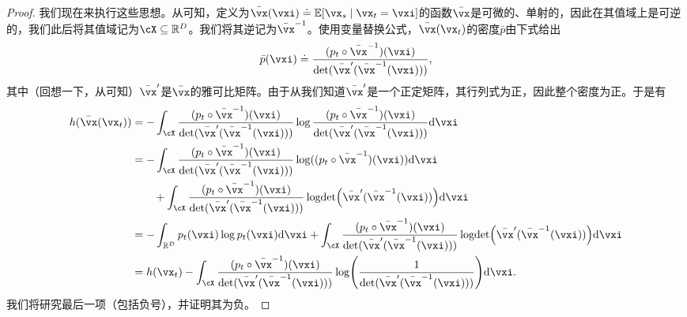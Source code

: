 \documentclass[../../book-main_zh.tex]{subfiles}
\begin{document}
\begin{proof}
    我们现在来执行这些思想。从可知，定义为\(\bar{\vx}(\vxi) \doteq \Ex[\vx_{s} \given \vx_{t} = \vxi]\)的函数\(\bar{\vx}\)是可微的、单射的，因此在其值域上是可逆的，我们此后将其值域记为\(\cX \subseteq \R^{D}\)。我们将其逆记为\(\bar{\vx}^{-1}\)。使用变量替换公式，\(\bar{\vx}(\vx_{t})\)的密度\(\bar{p}\)由下式给出
    \begin{equation}
        \bar{p}(\vxi) \doteq \frac{(p_{t} \circ \bar{\vx}^{-1})(\vxi)}{\det(\bar{\vx}^{\prime}(\bar{\vx}^{-1}(\vxi)))},
    \end{equation}
    其中（回想一下，从可知）\(\bar{\vx}^{\prime}\)是\(\bar{\vx}\)的雅可比矩阵。由于从我们知道\(\bar{\vx}^{\prime}\)是一个正定矩阵，其行列式为正，因此整个密度为正。于是有
    \begin{align}
        h(\bar{\vx}(\vx_{t}))
        &= -\int_{\cX}\frac{(p_{t} \circ \bar{\vx}^{-1})(\vxi)}{\det(\bar{\vx}^{\prime}(\bar{\vx}^{-1}(\vxi)))} \log \frac{(p_{t} \circ \bar{\vx}^{-1})(\vxi)}{\det(\bar{\vx}^{\prime}(\bar{\vx}^{-1}(\vxi)))} \odif{\vxi} \\ 
        &= -\int_{\cX}\frac{(p_{t} \circ \bar{\vx}^{-1})(\vxi)}{\det(\bar{\vx}^{\prime}(\bar{\vx}^{-1}(\vxi)))} \log((p_{t} \circ \bar{\vx}^{-1})(\vxi))\odif{\vxi} \\ 
        &\qquad + \int_{\cX}\frac{(p_{t} \circ \bar{\vx}^{-1})(\vxi)}{\det(\bar{\vx}^{\prime}(\bar{\vx}^{-1}(\vxi)))}\logdet\rp{\bar{\vx}^{\prime}(\bar{\vx}^{-1}(\vxi))}\odif{\vxi} \\ 
        &= -\int_{\R^{D}}p_{t}(\vxi)\log p_{t}(\vxi)\odif{\vxi} + \int_{\cX}\frac{(p_{t} \circ \bar{\vx}^{-1})(\vxi)}{\det(\bar{\vx}^{\prime}(\bar{\vx}^{-1}(\vxi)))}\logdet\rp{\bar{\vx}^{\prime}(\bar{\vx}^{-1}(\vxi))}\odif{\vxi} \\ 
        &= h(\vx_{t}) - \int_{\cX}\frac{(p_{t} \circ \bar{\vx}^{-1})(\vxi)}{\det(\bar{\vx}^{\prime}(\bar{\vx}^{-1}(\vxi)))}\log\rp{\frac{1}{\det(\bar{\vx}^{\prime}(\bar{\vx}^{-1}(\vxi)))}}\odif{\vxi}.
    \end{align}
    我们将研究最后一项（包括负号），并证明其为负。


\end{proof}
\end{document}
